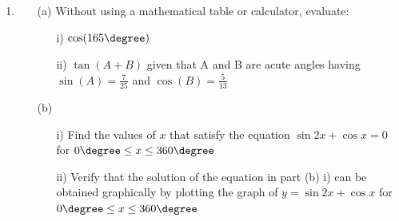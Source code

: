\begin{enumerate}
	\item
	\begin{enumerate}[topsep=0ex,itemsep=0ex,partopsep=1ex,parsep=1ex]
		\item[(a)] Without using a mathematical table or calculator, evaluate:
		\begin{enumerate}[topsep=0ex,itemsep=0ex,partopsep=1ex,parsep=1ex]
			\item[i)] $\cos(165 \degree)$
			\item[ii)] $\tan(A + B)$ given that A and B are acute angles having $\sin(A) = \frac{7}{25}$ and $\cos(B) = \frac{5}{13}$
		\end{enumerate}
		
		\item[(b)] 
		\begin{enumerate}[topsep=0ex,itemsep=0ex,partopsep=1ex,parsep=1ex]
			\item[i)] Find the values of $x$ that satisfy the equation $\sin{2x} + \cos{x} = 0$ for $0 \degree \leq x \leq 360 \degree$
			\item[ii)] Verify that the solution of the equation in part (b) i) can be obtained graphically by plotting the graph of $y= \sin{2x} + \cos{x}$ for $0 \degree \leq x \leq 360 \degree$
		\end{enumerate}
	\end{enumerate}

\end{enumerate}











